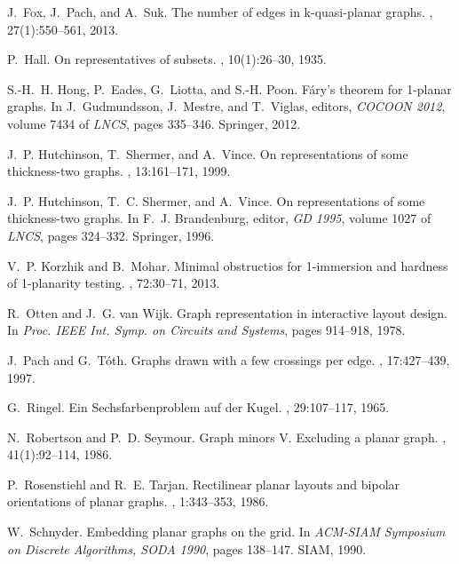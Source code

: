 \documentclass[runningheads]{llncs}
\begin{document}
\begin{thebibliography}{10}
J.~Fox, J.~Pach, and A.~Suk.
\newblock The number of edges in k-quasi-planar graphs.
, 27(1):550--561, 2013.

P.~Hall.
\newblock On representatives of subsets.
, 10(1):26–30, 1935.

S.-H.~H. Hong, P.~Eades, G.~Liotta, and S.-H. Poon.
\newblock F{\'a}ry's theorem for 1-planar graphs.
\newblock In J.~Gudmundsson, J.~Mestre, and T.~Viglas, editors, {\em {COCOON}
  2012}, volume 7434 of {\em {LNCS}}, pages 335--346. Springer, 2012.

J.~P. Hutchinson, T.~Shermer, and A.~Vince.
\newblock On representations of some thickness-two graphs.
, 13:161--171, 1999.

J.~P. Hutchinson, T.~C. Shermer, and A.~Vince.
\newblock On representations of some thickness-two graphs.
\newblock In F.~J. Brandenburg, editor, {\em {GD} 1995}, volume 1027 of {\em
  {LNCS}}, pages 324--332. Springer, 1996.

V.~P. Korzhik and B.~Mohar.
\newblock Minimal obstructios for 1-immersion and hardness of 1-planarity
  testing.
, 72:30--71, 2013.

R.~Otten and J.~G. van Wijk.
\newblock Graph representation in interactive layout design.
\newblock In {\em Proc. {IEEE} Int. Symp. on Circuits and Systems}, pages
  914--918, 1978.

J.~Pach and G.~T{\'o}th.
\newblock Graphs drawn with a few crossings per edge.
, 17:427--439, 1997.

G.~Ringel.
\newblock Ein {S}echsfarbenproblem auf der {K}ugel.
, 29:107--117,
  1965.

N.~Robertson and P.~D. Seymour.
\newblock Graph minors {V}. {E}xcluding a planar graph.
, 41(1):92--114, 1986.

P.~Rosenstiehl and R.~E. Tarjan.
\newblock Rectilinear planar layouts and bipolar orientations of planar graphs.
, 1:343--353, 1986.

W.~Schnyder.
\newblock Embedding planar graphs on the grid.
\newblock In {\em {ACM-SIAM} Symposium on Discrete Algorithms, {SODA} 1990},
  pages 138--147. {SIAM}, 1990.


\end{thebibliography}
\end{document}
